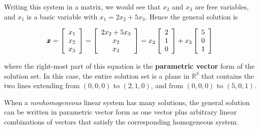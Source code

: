 \begin{solution}

Writing this system in a matrix, we would see that $x_2$ and $x_3$ are free variables, and $x_1$ is a basic variable with $x_1=2 x_2+5 x_3$. Hence the general solution is

$$
\pmb{x}=\left[\begin{array}{l}
x_1 \\
x_2 \\
x_3
\end{array}\right]=\left[\begin{array}{c}
2 x_2+5 x_3 \\
x_2 \\
x_3
\end{array}\right]=x_2\left[\begin{array}{l}
2 \\
1 \\
0
\end{array}\right]+x_3\left[\begin{array}{l}
5 \\
0 \\
1
\end{array}\right]
$$

where the right-most part of this equation is the \textbf{parametric vector} form of the solution set. In this case, the entire solution set is a plane in $\mathbb{R}^3$ that contains the two lines extending from $(0,0,0)$ to $(2,1,0)$, and from $(0,0,0)$ to $(5,0,1)$.
\end{solution}

When a \textit{nonhomogeneous} linear system has many solutions, the general solution can be written in parametric vector form as one vector plus arbitrary linear combinations of vectors that satisfy the corresponding homogeneous system.


